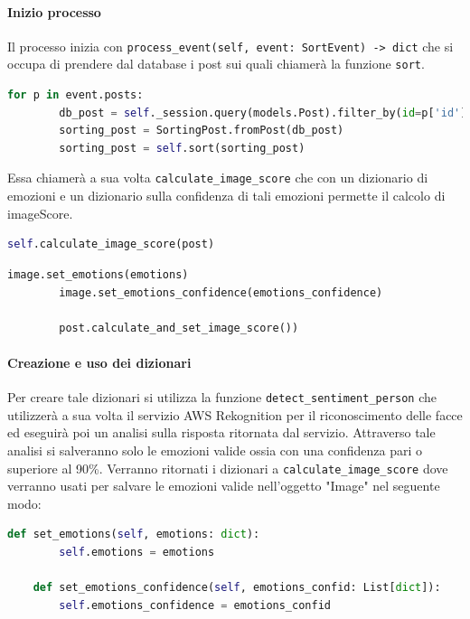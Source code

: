 \paragraph{Inizio processo} \aCapo{}
Il processo inizia con \verb+process_event(self, event: SortEvent) -> dict+ che si occupa di prendere dal database i post sui quali chiamerà la funzione \verb+sort+.
\begin{lstlisting}[language=Python]
        for p in event.posts:
        db_post = self._session.query(models.Post).filter_by(id=p['id']).first()
        sorting_post = SortingPost.fromPost(db_post)
        sorting_post = self.sort(sorting_post)
\end{lstlisting} 
Essa chiamerà a sua volta \verb+calculate_image_score+ che con un dizionario di emozioni e un dizionario sulla confidenza di tali emozioni permette il calcolo di imageScore.
\begin{lstlisting}[language=Python]
        self.calculate_image_score(post)
\end{lstlisting}
\begin{lstlisting}[language=Python]
        image.set_emotions(emotions)
        image.set_emotions_confidence(emotions_confidence)

        post.calculate_and_set_image_score())
\end{lstlisting} 
\paragraph{Creazione e uso dei dizionari} \aCapo{}
Per creare tale dizionari si utilizza la funzione \verb+detect_sentiment_person+ che utilizzerà a sua volta il servizio AWS Rekognition per il riconoscimento delle facce ed eseguirà poi un analisi sulla risposta ritornata dal servizio. Attraverso tale analisi si salveranno solo le emozioni valide ossia con una confidenza pari o superiore al 90\%. Verranno ritornati i dizionari a \verb+calculate_image_score+ dove verranno usati per salvare le emozioni valide nell'oggetto "Image" nel seguente modo:
\begin{lstlisting}[language=Python]
    def set_emotions(self, emotions: dict):
        self.emotions = emotions

    def set_emotions_confidence(self, emotions_confid: List[dict]):
        self.emotions_confidence = emotions_confid
\end{lstlisting}
